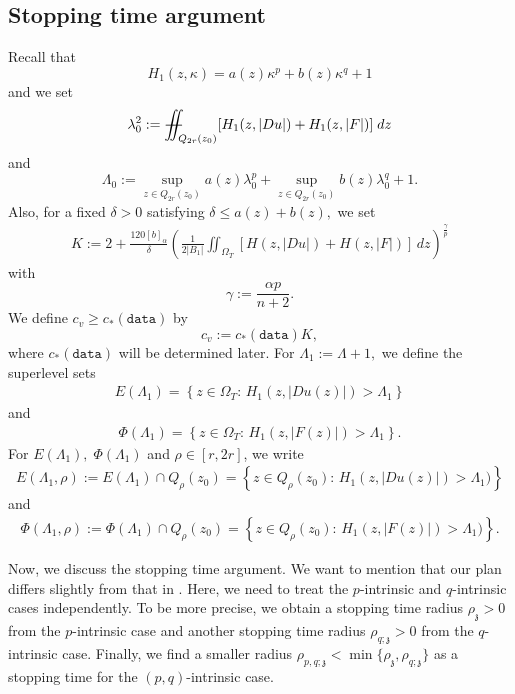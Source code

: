 \documentclass[11pt,oneside, english,reqno,twoside a4paper]{amsart}
\theoremstyle{definition}
\numberwithin{theorem}{section}
\numberwithin{equation}{section}
\newcommand{\iintss}{{\int\hspace{-0.28cm}\int}}
\newcommand{ \miints }{{\iintss\hspace{-0.56cm} -\hspace{-0.15cm}-}}
\newcommand{\miint}[1]{{\miints_{\hspace{-0.13cm}#1}}}
\begin{document}
\subsection{Stopping time argument}\label{subsec:stopping_time}
Recall that $$H_1(z,\kappa) = a(z)\kappa^p+b(z)\kappa^q+1$$ and we set
\begin{equation}    \label{eq: definition of lambda_0}
    \lambda_0^2:=\miint{Q_{2r}(z_0)} [H_1(z,|Du|)+H_1(z,|F|)] \; dz
\end{equation}
and
\begin{equation}    \label{eq: definition of Lambda_0}
    \Lambda_0:=\sup_{z\in Q_{2r}(z_0)}a(z)\lambda_0^p+\sup_{z\in Q_{2r}(z_0)}b(z)\lambda_0^q+1.
\end{equation}
Also, for a fixed $\delta>0$ satisfying $\delta \leq a(z)+b(z),$ we set
\begin{align}\label{defn of K}
    K:=2+\frac{120[b]_{\alpha}}{\delta} \left(\frac{1}{2|B_1|}\iint_{\Omega_T} [H(z,|Du|)+H(z,|F|)]\, dz\right)^{\frac{\gamma}{p}}
\end{align}
with $$\gamma:=\frac{\alpha p}{n+2}.$$ 
We define $c_v\geq c_*(\texttt{data})$ by 
\begin{equation}    \label{eq: definition of c_nu}
    c_v:=c_*(\texttt{data})K,
\end{equation}
where $c_*(\texttt{data})$ will be determined later.
For $\Lambda_1:=\Lambda+1, $ we define the superlevel sets
\begin{align}\label{Defn E_lambda}
E(\Lambda_1)=\left\{z \in \Omega_T:\, H_1\left(z, |Du(z)|\right)>\Lambda_1\right\}
\end{align}
and
\begin{align}\label{Defn Phi_lambda}
\Phi(\Lambda_1)=\left\{z \in \Omega_T:\, H_1 \left(z, |F(z)|\right)>\Lambda_1\right\}.
\end{align}
For $E(\Lambda_1),\; \Phi(\Lambda_1)$ and $\rho\in [r,2r]$, we write
\begin{align}\label{defn_E(Lambda, rho)}
E(\Lambda_1,\rho):=E(\Lambda_1)\cap Q_{\rho}(z_0)=\left\{z \in Q_{\rho}(z_0):\, H_1(z, |Du(z)|)>\Lambda_1)\right\}
\end{align}
and
\begin{align*}
\Phi(\Lambda_1,\rho):=\Phi(\Lambda_1)\cap Q_\rho(z_0)=\left\{z \in Q_{\rho}(z_0):\, H_1 (z, |F(z)|)>\Lambda_1)\right\}.
\end{align*}


Now, we discuss the stopping time argument. We want to mention that our plan differs slightly from that in \cite[Section 5.1]{2023_Gradient_Higher_Integrability_for_Degenerate_Parabolic_Double-Phase_Systems}. Here, we need to treat the $p$-intrinsic and $q$-intrinsic cases independently. To be  more precise, we obtain a stopping time radius $\rho_{\mathfrak z}>0$ from the $p$-intrinsic case and another stopping time radius $\rho_{q;\mathfrak z}>0$ from the $q$-intrinsic case. Finally, we find a smaller radius $\rho_{p,q;\mathfrak z}< \min\{\rho_{\mathfrak z}, \rho_{q;\mathfrak z}\}$ as a stopping time for the $(p,q)$-intrinsic case. 
\end{document}
